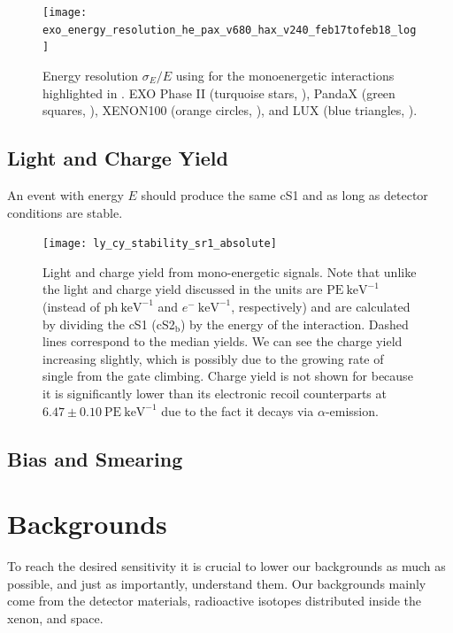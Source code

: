 \begin{figure}
\centering
\texttt{[image: exo\_energy\_resolution\_he\_pax\_v680\_hax\_v240\_feb17tofeb18\_log]}
\caption{Energy resolution $\sigma_E / E$ using for the monoenergetic interactions highlighted in
.  EXO Phase II (turquoise stars, ), PandaX (green
squares, ), XENON100 (orange circles, ), and LUX (blue triangles, ).}
\label{fig:calibrations_photon_charge_efficiences_ces}
\end{figure}



\subsection{Light and Charge Yield}
\label{subsec:det_char_ly_cy}
An event with energy $E$ should produce the same cS1 and \cstwob as long as detector conditions are stable.

\begin{figure}
\centering
\texttt{[image: ly\_cy\_stability\_sr1\_absolute]}
\caption{Light and charge yield from mono-energetic signals.  Note that unlike the light and charge yield discussed in
 the units are $\mathrm{PE\ keV^{-1}}$ (instead of $\mathrm{ph\ keV^{-1}}$ and
$e^-\ \mathrm{keV^{-1}}$, respectively) and are calculated by dividing the cS1 (cS2$_{\mathrm{b}}$) by the energy of the
interaction.  Dashed lines correspond to the median yields.  We can see the charge yield increasing slightly, which is possibly due to
the growing rate of single \electron from the gate climbing.  Charge yield is not shown for  because it is significantly
lower than its
electronic recoil counterparts at $6.47 \pm 0.10\ \mathrm{PE\ keV^{-1}}$ due to the fact it decays via $\alpha$-emission.}
\label{fig:calibrations_photon_charge_efficiences_ces_resolution}
\end{figure}



\subsection{Bias and Smearing}
\label{subsec:det_char_bias_smearing}



\section{Backgrounds}
\label{sec:backgrounds}
To reach the desired sensitivity it is crucial to lower our backgrounds as much as possible, and just as importantly, understand
them.  Our backgrounds mainly come from the detector materials, radioactive isotopes distributed inside the xenon, and space.



